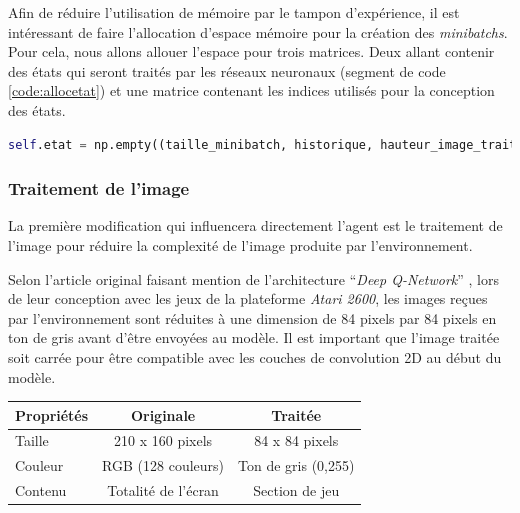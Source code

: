 \documentclass{article}
\begin{document}
\bigbreak
Afin de réduire l'utilisation de mémoire par le tampon d'expérience, il est intéressant de faire l'allocation d'espace mémoire pour la création des \textit{minibatchs}. Pour cela, nous allons allouer l'espace pour trois matrices. Deux allant contenir des états qui seront traités par les réseaux neuronaux (segment de code \ref{code:allocetat}) et une matrice contenant les indices utilisés pour la conception des états.

\bigbreak
\begin{lstlisting}[language=Python, caption={Allocation de la matrice pour contenir les états}, label={code:allocetat}]
self.etat = np.empty((taille_minibatch, historique, hauteur_image_traitee, largeur_image_traitee), dtype=np.uint8)
\end{lstlisting}


\subsubsection{Traitement de l'image}
La première modification qui influencera directement l'agent est le traitement de l'image pour réduire la complexité de l'image produite par l'environnement.

\bigbreak
Selon l'article original faisant mention de l'architecture ``\textit{Deep Q-Network}'' \citep{DQN-Article}, lors de leur conception avec les jeux de la plateforme \textit{Atari 2600}, les images reçues par l'environnement sont réduites à une dimension de 84 pixels par 84 pixels en ton de gris avant d'être envoyées au modèle. Il est important que l'image traitée soit carrée pour être compatible avec les couches de convolution 2D au début du modèle.

\begin{center}
  \begin{tabular}{| l | c | c |}
    \hline
    Propriétés  & Originale           & Traitée \\
    \hline
    Taille      & 210 x 160 pixels    & 84 x 84 pixels \\
    Couleur     & RGB (128 couleurs)  & Ton de gris (0,255)\\
    Contenu     & Totalité de l'écran & Section de jeu \\
    \hline
  \end{tabular}
\end{center}
\end{document}
